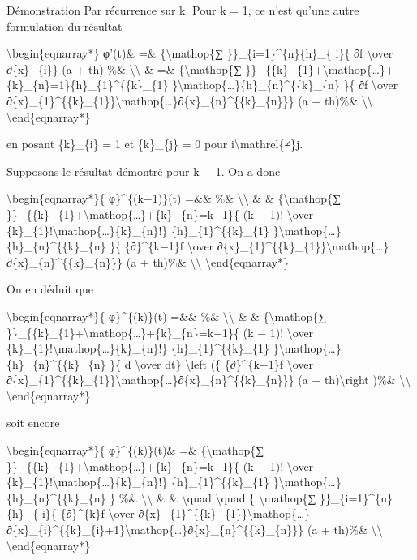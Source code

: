 Démonstration Par récurrence sur k. Pour k = 1, ce n'est qu'une autre
formulation du résultat

\textbackslash{}begin\{eqnarray*\} φ'(t)\& =\&
\{\textbackslash{}mathop\{∑ \}\}\_\{i=1\}\^{}\{n\}\{h\}\_\{ i\}\{ ∂f
\textbackslash{}over ∂\{x\}\_\{i\}\} (a + th) \%\&
\textbackslash{}\textbackslash{} \& =\& \{\textbackslash{}mathop\{∑
\}\}\_\{\{k\}\_\{1\}+\textbackslash{}mathop\{\ldots{}\}+\{k\}\_\{n\}=1\}\{h\}\_\{1\}\^{}\{\{k\}\_\{1\}
\}\textbackslash{}mathop\{\ldots{}\}\{h\}\_\{n\}\^{}\{\{k\}\_\{n\} \}\{
∂f \textbackslash{}over
∂\{x\}\_\{1\}\^{}\{\{k\}\_\{1\}\}\textbackslash{}mathop\{\ldots{}\}∂\{x\}\_\{n\}\^{}\{\{k\}\_\{n\}\}\}
(a + th)\%\& \textbackslash{}\textbackslash{}
\textbackslash{}end\{eqnarray*\}

en posant \{k\}\_\{i\} = 1 et \{k\}\_\{j\} = 0 pour
i\textbackslash{}mathrel\{≠\}j.

Supposons le résultat démontré pour k − 1. On a donc

\textbackslash{}begin\{eqnarray*\}\{ φ\}\^{}\{(k−1)\}(t) =\&\& \%\&
\textbackslash{}\textbackslash{} \& \& \{\textbackslash{}mathop\{∑
\}\}\_\{\{k\}\_\{1\}+\textbackslash{}mathop\{\ldots{}\}+\{k\}\_\{n\}=k−1\}\{
(k − 1)! \textbackslash{}over
\{k\}\_\{1\}!\textbackslash{}mathop\{\ldots{}\}\{k\}\_\{n\}!\}
\{h\}\_\{1\}\^{}\{\{k\}\_\{1\}
\}\textbackslash{}mathop\{\ldots{}\}\{h\}\_\{n\}\^{}\{\{k\}\_\{n\} \}\{
\{∂\}\^{}\{k−1\}f \textbackslash{}over
∂\{x\}\_\{1\}\^{}\{\{k\}\_\{1\}\}\textbackslash{}mathop\{\ldots{}\}∂\{x\}\_\{n\}\^{}\{\{k\}\_\{n\}\}\}
(a + th)\%\& \textbackslash{}\textbackslash{}
\textbackslash{}end\{eqnarray*\}

On en déduit que

\textbackslash{}begin\{eqnarray*\}\{ φ\}\^{}\{(k)\}(t) =\&\& \%\&
\textbackslash{}\textbackslash{} \& \& \{\textbackslash{}mathop\{∑
\}\}\_\{\{k\}\_\{1\}+\textbackslash{}mathop\{\ldots{}\}+\{k\}\_\{n\}=k−1\}\{
(k − 1)! \textbackslash{}over
\{k\}\_\{1\}!\textbackslash{}mathop\{\ldots{}\}\{k\}\_\{n\}!\}
\{h\}\_\{1\}\^{}\{\{k\}\_\{1\}
\}\textbackslash{}mathop\{\ldots{}\}\{h\}\_\{n\}\^{}\{\{k\}\_\{n\} \}\{
d \textbackslash{}over dt\} \textbackslash{}left (\{ \{∂\}\^{}\{k−1\}f
\textbackslash{}over
∂\{x\}\_\{1\}\^{}\{\{k\}\_\{1\}\}\textbackslash{}mathop\{\ldots{}\}∂\{x\}\_\{n\}\^{}\{\{k\}\_\{n\}\}\}
(a + th)\textbackslash{}right )\%\& \textbackslash{}\textbackslash{}
\textbackslash{}end\{eqnarray*\}

soit encore

\textbackslash{}begin\{eqnarray*\}\{ φ\}\^{}\{(k)\}(t)\& =\&
\{\textbackslash{}mathop\{∑
\}\}\_\{\{k\}\_\{1\}+\textbackslash{}mathop\{\ldots{}\}+\{k\}\_\{n\}=k−1\}\{
(k − 1)! \textbackslash{}over
\{k\}\_\{1\}!\textbackslash{}mathop\{\ldots{}\}\{k\}\_\{n\}!\}
\{h\}\_\{1\}\^{}\{\{k\}\_\{1\}
\}\textbackslash{}mathop\{\ldots{}\}\{h\}\_\{n\}\^{}\{\{k\}\_\{n\} \}
\%\& \textbackslash{}\textbackslash{} \& \& \textbackslash{}quad
\textbackslash{}quad \{ \textbackslash{}mathop\{∑
\}\}\_\{i=1\}\^{}\{n\}\{h\}\_\{ i\}\{ \{∂\}\^{}\{k\}f
\textbackslash{}over
∂\{x\}\_\{1\}\^{}\{\{k\}\_\{1\}\}\textbackslash{}mathop\{\ldots{}\}∂\{x\}\_\{i\}\^{}\{\{k\}\_\{i\}+1\}\textbackslash{}mathop\{\ldots{}\}∂\{x\}\_\{n\}\^{}\{\{k\}\_\{n\}\}\}
(a + th)\%\& \textbackslash{}\textbackslash{}
\textbackslash{}end\{eqnarray*\}

